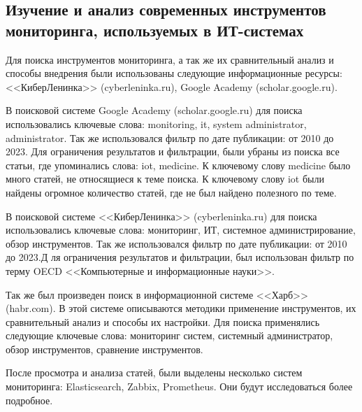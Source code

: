 \subsection{Изучение и анализ современных инструментов мониторинга, используемых в ИТ-системах}

Для поиска инструментов мониторинга, а так же их сравнительный анализ и способы внедрения 
были использованы следующие информационные ресурсы: <<КиберЛенинка>> (cyberleninka.ru), Google Academy (scholar.google.ru).

В поисковой системе Google Academy (scholar.google.ru) для поиска использовались ключевые слова: 
monitoring, it, system administrator, administrator. Так же использовался фильтр по дате публикации: от 2010 до 2023.
Для ограничения результатов и фильтрации, были убраны из поиска
все статьи, где упоминались слова: iot, medicine. К ключевому слову medicine было много статей, не относящиеся к теме поиска.
К ключевому слову iot были найдены огромное количество статей, где не был найдено полезного по теме.




В поисковой системе <<КиберЛенинка>> (cyberleninka.ru) для поиска использовались ключевые слова: 
мониторинг, ИТ, системное администрирование, обзор инструментов. Так же использовался фильтр по дате публикации: 
от 2010 до 2023.Д ля ограничения результатов и фильтрации, был использован фильтр по терму OECD
<<Компьютерные и информационные науки>>.



Так же был произведен поиск в информационной системе <<Харб>> (habr.com). В этой системе описываются
методики применение инструментов, их сравнительный анализ и способы их настройки.
Для поиска применялись следующие ключевые слова: мониторинг систем, системный администратор, обзор 
инструментов, сравнение инструментов. 



После просмотра и анализа статей, были выделены несколько систем мониторинга: Elasticsearch, Zabbix, Prometheus.
Они будут исследоваться более подробное.